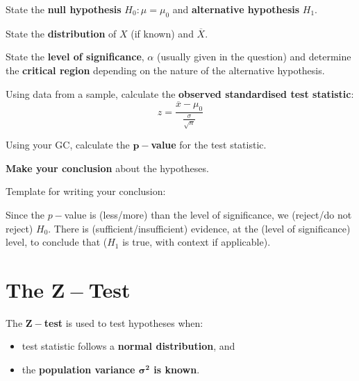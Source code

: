 \documentclass[11pt,a4paper]{book}
\begin{document}
\begin{tcolorbox}[colback=blue!5, colframe=black, boxrule=.4pt, sharpish corners]

\begin{steps}[leftmargin=1.5cm]

\item  State the \textbf{null hypothesis} $H_{0}:\mu=\mu_{0}$ and
\textbf{alternative hypothesis} $H_{1}$.

\item  State the \textbf{distribution} of $X$ (if known) and $\overline{X}$.

\item  State the \textbf{level of significance}, $\alpha$ (usually
given in the question) and determine the \textbf{critical region}
depending on the nature of the alternative hypothesis.

\item  Using data from a sample, calculate the \textbf{observed standardised
test statistic}:
\[
z=\frac{\overline{x}-\mu_{0}}{\frac{\sigma}{\sqrt{n}}}
\]

\item  Using your GC, calculate the \textbf{$\boldsymbol{p-}$value}
for the test statistic.

\item  \textbf{Make your conclusion }about the hypotheses.

Template for writing your conclusion:
\begin{tcolorbox}[colback=blue!5, colframe=black,boxrule=.4pt, sharpish corners]

Since the $p-$value is (less/more) than the level of significance,
we (reject/do not reject) $H_{0}$. There is (sufficient/insufficient)
evidence, at the (level of significance) level, to conclude that ($H_{1}$
is true, with context if applicable).
\end{tcolorbox}

\end{steps}
\end{tcolorbox}

\newpage

\section{The $\boldsymbol{Z-}$Test}

\begin{tcolorbox}[colback=blue!5, colframe=black, boxrule=.4pt, sharpish corners]

The $\boldsymbol{Z-}$\textbf{test }is used to test hypotheses when:

\begin{itemize}

\item  test statistic follows a \textbf{normal distribution}, and

\item  the \textbf{population variance $\boldsymbol{\sigma^{2}}$
is known}.

\end{itemize}
\end{tcolorbox}
\end{document}
